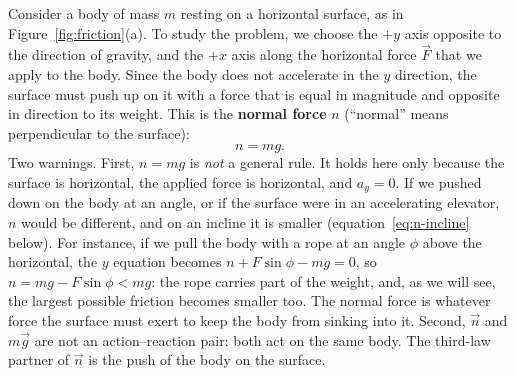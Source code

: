 \documentclass[11pt,a4paper]{article}
\begin{document}
Consider a body of mass $m$ resting on a horizontal surface, as in Figure~\ref{fig:friction}(a). To
study the problem, we choose the $+y$ axis opposite to the direction of gravity, and the $+x$ axis
along the horizontal force $\vec{F}$ that we apply to the body. Since the body does not accelerate in
the $y$ direction, the surface must push up on it with a force that is equal in magnitude and
opposite in direction to its weight. This is the \textbf{normal force} $n$ (``normal'' means
perpendicular to the surface):
\begin{equation}\label{eq:n-flat}
  n = mg .
\end{equation}
Two warnings. First, $n = mg$ is \emph{not} a general rule. It holds here only because the surface is
horizontal, the applied force is horizontal, and $a_y = 0$. If we pushed down on the body at an
angle, or if the surface were in an accelerating elevator, $n$ would be different, and on an incline
it is smaller (equation~\eqref{eq:n-incline} below). For instance, if we pull the body with a rope at
an angle $\phi$ above the horizontal, the $y$ equation becomes $n + F\sin\phi - mg = 0$, so
$n = mg - F\sin\phi < mg$: the rope carries part of the weight, and, as we will see, the largest
possible friction becomes smaller too. The normal force is whatever force the surface must exert to
keep the body from sinking into it. Second, $\vec{n}$ and $m\vec{g}$ are not an
action--reaction pair: both act on the same body. The third-law partner of $\vec{n}$ is the push of
the body on the surface.
\end{document}
